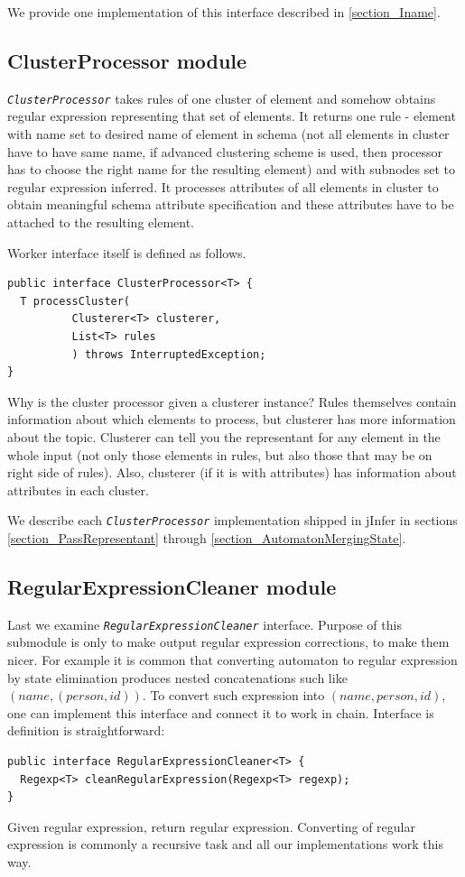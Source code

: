 \documentclass[a4paper,10pt,oneside]{article}
\newcommand{\jmodule}[1]{\texttt{\textit{#1}}}
\begin{document}
We provide one implementation of this interface described in \ref{section_Iname}.

\subsection{ClusterProcessor module}
\jmodule{ClusterProcessor} takes rules of one cluster of element and somehow obtains regular expression representing that set of elements. It returns one rule - element with name set to desired name of element in schema (not all elements in cluster have to have same name, if advanced clustering scheme is used, then processor has to choose the right name for the resulting element) and with subnodes set to regular expression inferred.
It processes attributes of all elements in cluster to obtain meaningful schema attribute specification and these attributes have to be attached to the resulting element.

Worker interface itself is defined as follows.
\begin{verbatim}
public interface ClusterProcessor<T> {
  T processCluster(
          Clusterer<T> clusterer,
          List<T> rules
          ) throws InterruptedException;
}
\end{verbatim}
Why is the cluster processor given a clusterer instance?
Rules themselves contain information about which elements to process, but clusterer has more information about the topic.
Clusterer can tell you the representant for any element in the whole input (not only those elements in rules, but also those that may be on right side of rules). Also, clusterer (if it is with attributes) has information about attributes in each cluster.

We describe each \jmodule{ClusterProcessor} implementation shipped in jInfer in sections \ref{section_PassRepresentant} through \ref{section_AutomatonMergingState}.

\subsection{RegularExpressionCleaner module}
Last we examine \jmodule{RegularExpressionCleaner} interface.
Purpose of this submodule is only to make output regular expression corrections, to make them nicer.
For example it is common that converting automaton to regular expression by state elimination produces nested concatenations such like $(name, (person, id))$.
To convert such expression into $(name, person, id)$, one can implement this interface and connect it to work in chain.
Interface is definition is straightforward:
\begin{verbatim}
public interface RegularExpressionCleaner<T> {
  Regexp<T> cleanRegularExpression(Regexp<T> regexp);
}
\end{verbatim}
Given regular expression, return regular expression.
Converting of regular expression is commonly a recursive task and all our implementations work this way.
\end{document}
